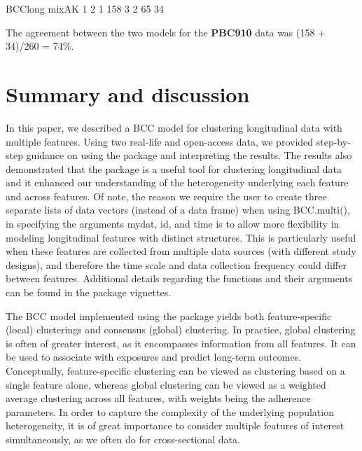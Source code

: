 \begin{example}
     BCClong
mixAK   1   2
    1 158   3
    2  65  34
\end{example}

The agreement between the two models for the \textbf{PBC910} data was (158 + 34)/260 = 74\%.

\section{Summary and discussion} \label{sec:summary}

In this paper, we described a BCC model for clustering longitudinal data with multiple features. Using two real-life and open-access data, we provided step-by-step guidance on using the  package and interpreting the results. The results also demonstrated that the  package is a useful tool for clustering longitudinal data and it enhanced our understanding of the heterogeneity underlying each feature and across features. Of note, the reason we require the user to create three separate lists of data vectors (instead of a data frame) when using BCC.multi(), in specifying the arguments mydat, id, and time is to allow more flexibility in modeling longitudinal features with distinct structures. This is particularly useful when these features are collected from multiple data sources (with different study designs), and therefore the time scale and data collection frequency could differ between features. Additional details regarding the functions and their arguments can be found in the package vignettes.

The BCC model implemented using the  package yields both feature-specific (local) clusterings and consensus (global) clustering. In practice, global clustering is often of greater interest, as it encompasses information from all features. It can be used to associate with exposures and predict long-term outcomes. Conceptually, feature-specific clustering can be viewed as clustering based on a single feature alone, whereas global clustering can be viewed as a weighted average clustering across all features, with weights being the adherence parameters. In order to capture the complexity of the underlying population heterogeneity, it is of great importance to consider multiple features of interest simultaneously, as we often do for cross-sectional data. 

